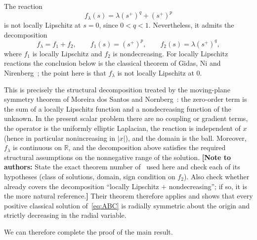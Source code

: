 \documentclass[11pt]{article}
\newcommand{\add}[1]{{\color{blue}#1}}
\newcommand{\nota}[1]{{\color{green!50!black}\textbf{[Note to authors:} #1\textbf{]}}}
\newcommand{\oldrev}[1]{#1}
\theoremstyle{definition}
\begin{document}
The reaction
\[
f_\lambda(s)
=
\lambda(s^+)^q+(s^+)^p
\]
is not locally Lipschitz at $s=0$, since $0<q<1$. Nevertheless, it
admits the decomposition
\[
f_\lambda=f_1+f_2,
\qquad
f_1(s)=(s^+)^p,
\qquad
f_2(s)=\lambda(s^+)^q,
\]
where $f_1$ is locally Lipschitz and $f_2$ is nondecreasing.
\add{For locally Lipschitz reactions the conclusion below is the
classical theorem of Gidas, Ni and Nirenberg~\cite{GNN}; the point here
is that $f_\lambda$ is not locally Lipschitz at $0$.}

This is precisely the structural decomposition treated by the moving-plane
symmetry theorem of Moreira dos Santos and Nornberg~\cite{SantosNornberg}:
the zero-order term is the sum of a locally Lipschitz function and a
nondecreasing function of the unknown. In the present scalar problem there are
no coupling or gradient terms, the operator is the uniformly elliptic
Laplacian, the reaction is independent of $x$ (hence in particular
nonincreasing in $|x|$), and the domain is the ball.
\oldrev{Moreover, $f_\lambda$ is continuous on $\mathbb R$,
and the decomposition above satisfies the required structural assumptions
on the nonnegative range of the solution.}
\nota{State the exact theorem number of~\cite{SantosNornberg} used here
and check each of its hypotheses (class of solutions, domain, sign
condition on $f_2$). Also check whether~\cite{GNN} already covers the
decomposition ``locally Lipschitz $+$ nondecreasing''; if so, it is the
more natural reference.}
Their theorem therefore
applies and shows that every positive classical solution of~\eqref{eq:ABC}
is radially symmetric about the origin and strictly decreasing in the radial
variable.

We can therefore complete the proof of the main result.
\end{document}
